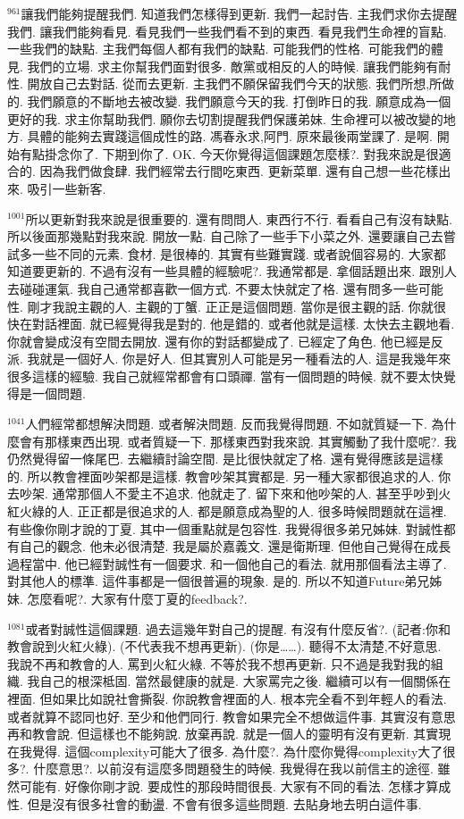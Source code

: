 \documentclass{book}
\begin{document}
$^{961}$讓我們能夠提醒我們.
知道我們怎樣得到更新.
我們一起討告.
主我們求你去提醒我們.
讓我們能夠看見.
看見我們一些我們看不到的東西.
看見我們生命裡的盲點.
一些我們的缺點.
主我們每個人都有我們的缺點.
可能我們的性格.
可能我們的體見.
我們的立場.
求主你幫我們面對很多.
敵黨或相反的人的時候.
讓我們能夠有耐性.
開放自己去對話.
從而去更新.
主我們不願保留我們今天的狀態.
我們所想,所做的.
我們願意的不斷地去被改變.
我們願意今天的我.
打倒昨日的我.
願意成為一個更好的我.
求主你幫助我們.
願你去切割提醒我們保護弟妹.
生命裡可以被改變的地方.
具體的能夠去實踐這個成性的路.
馮春永求,阿門.
原來最後兩堂課了.
是啊.
開始有點掛念你了.
下期到你了.
OK.
今天你覺得這個課題怎麼樣?.
對我來說是很適合的.
因為我們做食肆.
我們經常去行間吃東西.
更新菜單.
還有自己想一些花樣出來.
吸引一些新客.

$^{1001}$所以更新對我來說是很重要的.
還有問問人.
東西行不行.
看看自己有沒有缺點.
所以後面那幾點對我來說.
開放一點.
自己除了一些手下小菜之外.
還要讓自己去嘗試多一些不同的元素.
食材.
是很棒的.
其實有些難實踐.
或者說個容易的.
大家都知道要更新的.
不過有沒有一些具體的經驗呢?.
我通常都是.
拿個話題出來.
跟別人去碰碰運氣.
我自己通常都喜歡一個方式.
不要太快就定了格.
還有問多一些可能性.
剛才我說主觀的人.
主觀的丁蟹.
正正是這個問題.
當你是很主觀的話.
你就很快在對話裡面.
就已經覺得我是對的.
他是錯的.
或者他就是這樣.
太快去主觀地看.
你就會變成沒有空間去開放.
還有你的對話都變成了.
已經定了角色.
他已經是反派.
我就是一個好人.
你是好人.
但其實別人可能是另一種看法的人.
這是我幾年來很多這樣的經驗.
我自己就經常都會有口頭禪.
當有一個問題的時候.
就不要太快覺得是一個問題.

$^{1041}$人們經常都想解決問題.
或者解決問題.
反而我覺得問題.
不如就質疑一下.
為什麼會有那樣東西出現.
或者質疑一下.
那樣東西對我來說.
其實觸動了我什麼呢?.
我仍然覺得留一條尾巴.
去繼續討論空間.
是比很快就定了格.
還有覺得應該是這樣的.
所以教會裡面吵架都是這樣.
教會吵架其實都是.
另一種大家都很追求的人.
你去吵架.
通常那個人不愛主不追求.
他就走了.
留下來和他吵架的人.
甚至乎吵到火紅火綠的人.
正正都是很追求的人.
都是願意成為聖的人.
很多時候問題就在這裡.
有些像你剛才說的丁夏.
其中一個重點就是包容性.
我覺得很多弟兄姊妹.
對誠性都有自己的觀念.
他未必很清楚.
我是屬於嘉義文.
還是衛斯理.
但他自己覺得在成長過程當中.
他已經對誠性有一個要求.
和一個他自己的看法.
就用那個看法主導了.
對其他人的標準.
這件事都是一個很普遍的現象.
是的.
所以不知道Future弟兄姊妹.
怎麼看呢?.
大家有什麼丁夏的feedback?.

$^{1081}$或者對誠性這個課題.
過去這幾年對自己的提醒.
有沒有什麼反省?.
(記者:你和教會說到火紅火綠).
(不代表我不想再更新).
(你是……).
聽得不太清楚,不好意思.
我說不再和教會的人.
罵到火紅火綠.
不等於我不想再更新.
只不過是我對我的組織.
我自己的根深柢固.
當然最健康的就是.
大家罵完之後.
繼續可以有一個關係在裡面.
但如果比如說社會撕裂.
你說教會裡面的人.
根本完全看不到年輕人的看法.
或者就算不認同也好.
至少和他們同行.
教會如果完全不想做這件事.
其實沒有意思再和教會說.
但這樣也不能夠說.
放棄再說.
就是一個人的靈明有沒有更新.
其實現在我覺得.
這個complexity可能大了很多.
為什麼?.
為什麼你覺得complexity大了很多?.
什麼意思?.
以前沒有這麼多問題發生的時候.
我覺得在我以前信主的途徑.
雖然可能有.
好像你剛才說.
要成性的那段時間很長.
大家有不同的看法.
怎樣才算成性.
但是沒有很多社會的動盪.
不會有很多這些問題.
去貼身地去明白這件事.
\end{document}
